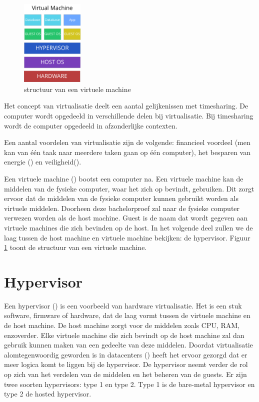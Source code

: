 \begin{figure}
    \centering
    \includegraphics[width=3cm]{img/virtual-machine}
    \caption{structuur van een virtuele machine}
    \label{fig:virtualmachine}
\end{figure}

Het concept van virtualisatie deelt een aantal gelijkenissen met timesharing. De computer wordt opgedeeld in verschillende delen bij virtualisatie. Bij timesharing wordt de computer opgedeeld in afzonderlijke contexten.

Een aantal voordelen van virtualisatie zijn de volgende: financieel voordeel (men kan van één taak naar meerdere taken gaan op één computer), het besparen van energie (\cite{beloglazov_energy_2010}) en veiligheid(\cite{mortleman_security_2009}).

Een virtuele machine (\cite{smith_architecture_2005}) bootst een computer na. Een virtuele machine kan de middelen van de fysieke computer, waar het zich op bevindt, gebruiken. Dit zorgt ervoor dat de middelen van de fysieke computer kunnen gebruikt worden als virtuele middelen. Doorheen deze bachelorproef zal naar de fysieke computer verwezen worden als de host machine. Guest is de naam dat wordt gegeven aan virtuele machines die zich bevinden op de host. In het volgende deel zullen we de laag tussen de host machine en virtuele machine bekijken: de hypervisor. Figuur \ref{fig:virtualmachine} toont de structuur van een virtuele machine. 

\section{Hypervisor}

Een hypervisor (\cite{popek_formal_1974}) is een voorbeeld van hardware virtualisatie. Het is een stuk software, firmware of hardware, dat de laag vormt tussen de virtuele machine en de host machine. De host machine zorgt voor de middelen zoals CPU, RAM, enzoverder. Elke virtuele machine die zich bevindt op de host machine zal dan gebruik kunnen maken van een gedeelte van deze middelen. Doordat virtualisatie alomtegenwoordig geworden is in datacenters (\cite{soundararajan_impact_2010}) heeft het ervoor gezorgd dat er meer logica komt te liggen bij de hypervisor. De hypervisor neemt verder de rol op zich van het verdelen van de middelen en het beheren van de guests. Er zijn twee soorten hypervisors: type 1 en type 2. Type 1 is de bare-metal hypervisor en type 2 de hosted hypervisor.

